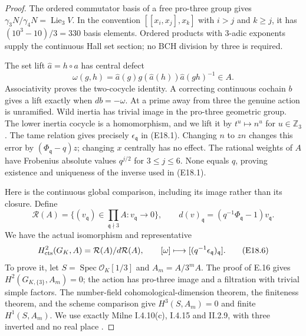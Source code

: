 \documentclass[11pt,oneside]{article}
\begin{document}
\begin{proof}
The ordered commutator basis of a free pro-three
group gives $\gamma_3N/\gamma_4N=\operatorname{Lie}_3V$.
In the convention $[[x_i,x_j],x_k]$ with $i>j$ and
$k\ge j$, it has $(10^3-10)/3=330$ basis elements.
Ordered products with $3$-adic exponents supply the
continuous Hall set section; no BCH division by
three is required.

The set lift $\widehat a=h\circ a$ has central defect
\[
 \omega(g,h)=\widehat a(g)g(\widehat a(h))
                    \widehat a(gh)^{-1}\in A.
 \tag{E18.5}
\]
Associativity proves the two-cocycle identity.
A correcting continuous cochain $b$ gives a lift
exactly when $db=-\omega$. At a prime away from
three the genuine action is unramified. Wild
inertia has trivial image in the pro-three
geometric group. The lower inertia cocycle is a
homomorphism, and we lift it by
$t^u\mapsto n^u$ for $u\in\mathbb Z_3$.
The tame relation gives precisely
$\epsilon_{\mathfrak q}$ in (E18.1).
Changing $n$ to $zn$ changes this error by
$(\Phi_{\mathfrak q}-q)z$; changing $x$ centrally
has no effect. The rational weights of $A$ have
Frobenius absolute values $q^{j/2}$ for
$3\le j\le6$. None equals $q$, proving existence
and uniqueness of the inverse used in (E18.1).

Here is the continuous global comparison, including
its image rather than its closure. Define
\[
 \mathcal R(A)=\{(v_{\mathfrak q})\in
          \prod_{\mathfrak q\nmid3}A:
                   v_{\mathfrak q}\longrightarrow0\},
 \qquad d(v)_{\mathfrak q}=(q^{-1}\Phi_{\mathfrak q}-1)v_{\mathfrak q}.
\]
We have the actual isomorphism and representative
\[
 H^2_{\rm cts}(G_K,A)=\mathcal R(A)/d\mathcal R(A),
 \qquad [\omega]\longmapsto
       [(q^{-1}\epsilon_{\mathfrak q})_{\mathfrak q}].
 \tag{E18.6}
\]
To prove it, let $S=\operatorname{Spec}\mathcal O_K[1/3]$
and $A_m=A/3^mA$. The proof of E.16 gives
$H^2(G_{K,\{3\}},A_m)=0$; the action has pro-three
image and a filtration with trivial simple factors.
The number-field cohomological-dimension theorem,
the finiteness theorem, and the scheme comparison
give $H^3(S,A_m)=0$ and finite $H^1(S,A_m)$.
We use exactly Milne I.4.10(c), I.4.15 and II.2.9,
with three inverted and no real place
\cite{E_density_MilneADT}.


\end{proof}
\end{document}
